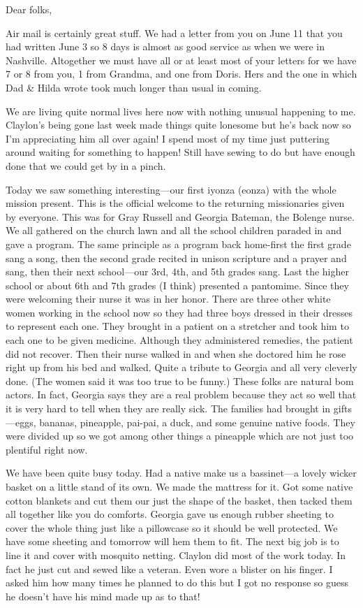 \documentclass[
]{book}
\begin{document}
Dear folks,

Air mail is certainly great stuff. We had a letter from you on June 11 that you had written June 3 so 8 days is almost as good service as when we were in Nashville. Altogether we must have all or at least most of your letters for we have 7 or 8 from you, 1 from Grandma, and one from Doris. Hers and the one in which Dad \& Hilda wrote took much longer than usual in coming.

We are living quite normal lives here now with nothing unusual happening to me. Claylon's being gone last week made things quite lonesome but he's back now so I'm appreciating him all over again! I spend most of my time just puttering around waiting for something to happen! Still have sewing to do but have enough done that we could get by in a pinch.

Today we saw something interesting---our first iyonza (eonza) with the whole mission present. This is the official welcome to the returning missionaries given by everyone. This was for Gray Russell and Georgia Bateman, the Bolenge nurse. We all gathered on the church lawn and all the school children paraded in and gave a program. The same principle as a program back home-first the first grade sang a song, then the second grade recited in unison scripture and a prayer and sang, then their next school---our 3rd, 4th, and 5th grades sang. Last the higher school or about 6th and 7th grades (I think) presented a pantomime. Since they were welcoming their nurse it was in her honor. There are three other white women working in the school now so they had three boys dressed in their dresses to represent each one. They brought in a patient on a stretcher and took him to each one to be given medicine. Although they administered remedies, the patient did not recover. Then their nurse walked in and when she doctored him he rose right up from his bed and walked. Quite a tribute to Georgia and all very cleverly done. (The women said it was too true to be funny.) These folks are natural bom actors. In fact, Georgia says they are a real problem because they act so well that it is very hard to tell when they are really sick. The families had brought in gifts---eggs, bananas, pineapple, pai-pai, a duck, and some genuine native foods. They were divided up so we got among other things a pineapple which are not just too plentiful right now.

We have been quite busy today. Had a native make us a bassinet---a lovely wicker basket on a little stand of its own. We made the mattress for it. Got some native cotton blankets and cut them our just the shape of the basket, then tacked them all together like you do comforts. Georgia gave us enough rubber sheeting to cover the whole thing just like a pillowcase so it should be well protected. We have some sheeting and tomorrow will hem them to fit. The next big job is to line it and cover with mosquito netting. Claylon did most of the work today. In fact he just cut and sewed like a veteran. Even wore a blister on his finger. I asked him how many times he planned to do this but I got no response so guess he doesn't have his mind made up as to that!
\end{document}
